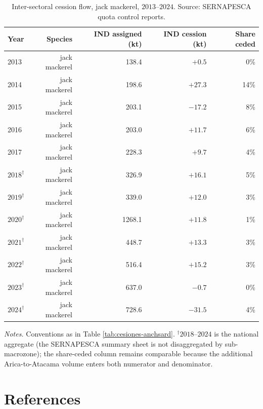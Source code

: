 \documentclass[
  11pt,
]{article}
\begin{document}
\begin{table}[H]
\centering\small
\renewcommand{\arraystretch}{0.95}
\caption{Inter-sectoral cession flow, jack mackerel, $2013$--$2024$. Source: SERNAPESCA quota control reports.\label{tab:cesiones-jurel}}
\begin{threeparttable}
\begin{tabular}{lrrrr}
\toprule
Year & Species & IND assigned (kt) & IND cession (kt) & Share ceded \\
\midrule
2013 & jack mackerel & 138.4 & $+0.5$  & 0\%  \\
2014 & jack mackerel & 198.6 & $+27.3$ & 14\% \\
2015 & jack mackerel & 203.1 & $-17.2$ & 8\%  \\
2016 & jack mackerel & 203.0 & $+11.7$ & 6\%  \\
2017 & jack mackerel & 228.3 & $+9.7$  & 4\%  \\
$2018^{\dagger}$ & jack mackerel &  326.9 & $+16.1$ & 5\% \\
$2019^{\dagger}$ & jack mackerel &  339.0 & $+12.0$ & 3\% \\
$2020^{\dagger}$ & jack mackerel & 1268.1 & $+11.8$ & 1\% \\
$2021^{\dagger}$ & jack mackerel &  448.7 & $+13.3$ & 3\% \\
$2022^{\dagger}$ & jack mackerel &  516.4 & $+15.2$ & 3\% \\
$2023^{\dagger}$ & jack mackerel &  637.0 & $-0.7$  & 0\% \\
$2024^{\dagger}$ & jack mackerel &  728.6 & $-31.5$ & 4\% \\
\bottomrule
\end{tabular}
\begin{tablenotes}[flushleft]\footnotesize
\item \emph{Notes.} Conventions as in Table \ref{tab:cesiones-anchsard}. $^{\dagger}$$2018$--$2024$ is the national aggregate (the SERNAPESCA summary sheet is not disaggregated by sub-macrozone); the share-ceded column remains comparable because the additional Arica-to-Atacama volume enters both numerator and denominator.
\end{tablenotes}
\end{threeparttable}
\end{table}

\section*{References}\label{references}
\end{document}
